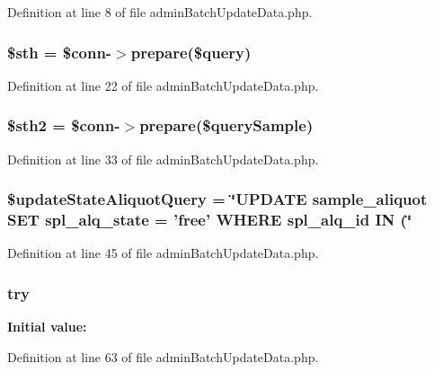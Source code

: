 Definition at line 8 of file admin\-Batch\-Update\-Data.\-php.

\hypertarget{admin_batch_update_data_8php_afa9126f9664959c02795be300a135f93}{
\subsubsection[{\$sth}]{\setlength{\rightskip}{0pt plus 5cm}\$sth = \$conn-\/$>$prepare(\$query)}}\label{admin_batch_update_data_8php_afa9126f9664959c02795be300a135f93}


Definition at line 22 of file admin\-Batch\-Update\-Data.\-php.

\hypertarget{admin_batch_update_data_8php_a2f84d43fa0033773278ae89295389bc6}{
\subsubsection[{\$sth2}]{\setlength{\rightskip}{0pt plus 5cm}\$sth2 = \$conn-\/$>$prepare(\$query\-Sample)}}\label{admin_batch_update_data_8php_a2f84d43fa0033773278ae89295389bc6}


Definition at line 33 of file admin\-Batch\-Update\-Data.\-php.

\hypertarget{admin_batch_update_data_8php_a9b5699e27fe7cf7436e0ee0f8ca958b7}{
\subsubsection[{\$update\-State\-Aliquot\-Query}]{\setlength{\rightskip}{0pt plus 5cm}\$update\-State\-Aliquot\-Query = \char`\"{}U\-P\-D\-A\-T\-E sample\-\_\-aliquot S\-E\-T spl\-\_\-alq\-\_\-state = 'free' W\-H\-E\-R\-E spl\-\_\-alq\-\_\-id I\-N (\char`\"{}}}\label{admin_batch_update_data_8php_a9b5699e27fe7cf7436e0ee0f8ca958b7}


Definition at line 45 of file admin\-Batch\-Update\-Data.\-php.

\hypertarget{admin_batch_update_data_8php_abe4cc9788f52e49485473dc699537388}{
\subsubsection[{try}]{\setlength{\rightskip}{0pt plus 5cm}try}}\label{admin_batch_update_data_8php_abe4cc9788f52e49485473dc699537388}
{\bfseries Initial value\-:}


Definition at line 63 of file admin\-Batch\-Update\-Data.\-php.

